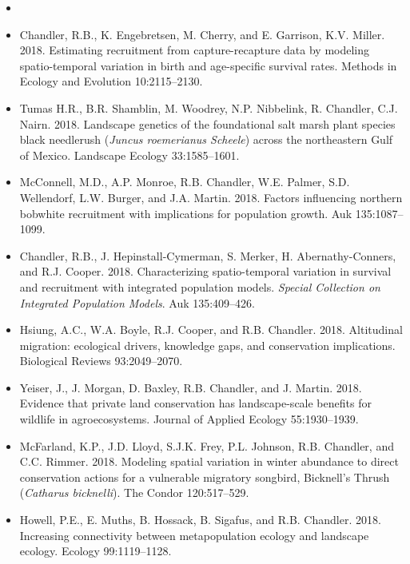 \begin{itemize}
  
\item[] { \\}

\item Chandler, R.B., K. Engebretsen, M. Cherry, and E. Garrison, 
  K.V. Miller. 2018. Estimating recruitment from
  capture-recapture data by modeling spatio-temporal variation in
  birth and age-specific survival rates. Methods in Ecology and
  Evolution 10:2115--2130.

\item Tumas H.R., B.R. Shamblin, M. Woodrey, N.P. Nibbelink,
  R. Chandler, C.J. Nairn. 2018. Landscape genetics of the
  foundational salt marsh plant species black needlerush ({\it Juncus
    roemerianus Scheele}) across the northeastern Gulf of
  Mexico. Landscape Ecology 33:1585--1601.
  
\item McConnell, M.D., A.P. Monroe, R.B. Chandler, W.E. Palmer,
  S.D. Wellendorf, L.W. Burger, and J.A. Martin. 2018. Factors
  influencing northern bobwhite recruitment with implications for
  population growth. Auk 135:1087--1099.
  
\item Chandler, R.B., J. Hepinstall-Cymerman, S. Merker, H. Abernathy-Conners,
  and R.J. Cooper. 2018. Characterizing spatio-temporal 
  variation in survival and recruitment with integrated population
  models. {\it Special Collection on Integrated Population
    Models}. Auk 135:409--426. 

\item Hsiung, A.C., W.A. Boyle, R.J. Cooper, and
  R.B. Chandler. 2018. Altitudinal migration: ecological drivers,
  knowledge gaps, and conservation implications. Biological Reviews 
  93:2049--2070. 

\item Yeiser, J., J. Morgan, D. Baxley, R.B. Chandler, and
  J. Martin. 2018. Evidence that private land conservation
  has landscape-scale benefits for wildlife in agroecosystems. Journal
  of Applied Ecology 55:1930--1939. 

\item McFarland, K.P., J.D. Lloyd, S.J.K. Frey, P.L. Johnson,
  R.B. Chandler, and C.C. Rimmer. 2018. Modeling spatial
  variation in winter abundance to direct conservation actions for a
  vulnerable migratory songbird, Bicknell’s Thrush ({\it Catharus
    bicknelli}). The Condor 120:517--529. 

\item Howell, P.E., E. Muths, B. Hossack, B. Sigafus, and
  R.B. Chandler. 2018. Increasing connectivity between 
  metapopulation ecology and landscape ecology. Ecology 99:1119--1128.  
  

\end{itemize}
